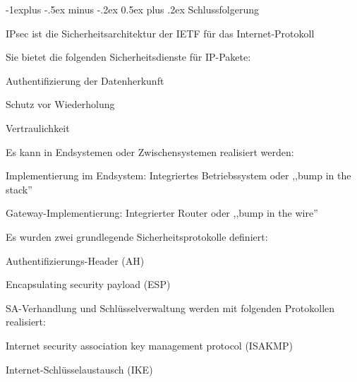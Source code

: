 \documentclass[a4paper]{article}
\makeatletter
\renewcommand{\subsection}{\@startsection{subsection}{2}{0mm}%
 {-1explus -.5ex minus -.2ex}%
 {0.5ex plus .2ex}%
 {\normalfont\normalsize\bfseries}}
\makeatother
\begin{document}
\begin{multicols}{3}
\begin{itemize*}
            \subsection{Schlussfolgerung}
            \begin{itemize*}
                  \item IPsec ist die Sicherheitsarchitektur der IETF für das
                  Internet-Protokoll
                  \item Sie bietet die folgenden Sicherheitsdienste für IP-Pakete:
                  \begin{itemize*}
                        \item Authentifizierung der Datenherkunft
                        \item Schutz vor Wiederholung
                        \item Vertraulichkeit
                  \end{itemize*}
                  \item Es kann in Endsystemen oder Zwischensystemen realisiert werden:
                  \begin{itemize*}
                        \item Implementierung im Endsystem: Integriertes Betriebssystem oder ,,bump in the stack''
                        \item Gateway-Implementierung: Integrierter Router oder ,,bump in the wire''
                  \end{itemize*}
                  \item Es wurden zwei grundlegende Sicherheitsprotokolle definiert:
                  \begin{itemize*}
                        \item Authentifizierungs-Header (AH)
                        \item Encapsulating security payload (ESP)
                  \end{itemize*}
                  \item SA-Verhandlung und Schlüsselverwaltung werden mit folgenden
                  Protokollen realisiert:
                  \begin{itemize*}
                        \item Internet security association key management protocol (ISAKMP)
                        \item Internet-Schlüsselaustausch (IKE)
                  \end{itemize*}
            \end{itemize*}


\end{itemize*}
\end{multicols}
\end{document}
